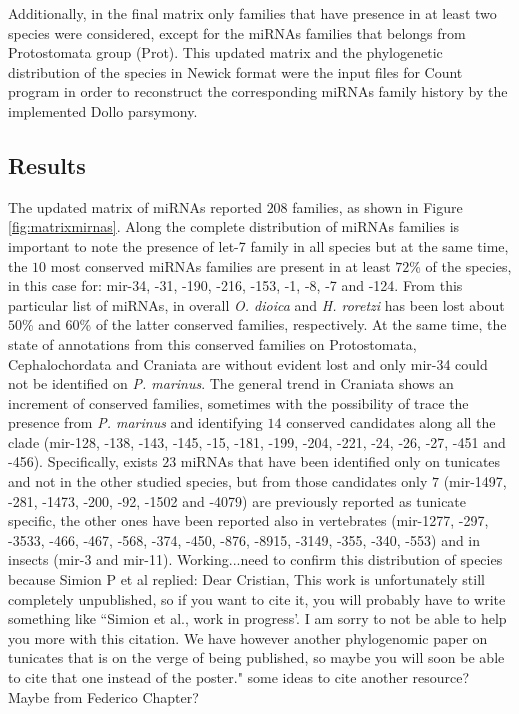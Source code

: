 \documentclass[11pt]{article}
\newcommand{\CAVH}[1]{\begingroup\color{red}#1\endgroup}
\begin{document}
Additionally, in the final matrix only families that have presence in at least 
two species were considered, except for the miRNAs families that belongs from 
Protostomata group (Prot). This updated matrix and the phylogenetic 
distribution of the species in Newick format were the input files for Count 
program \cite{Csuos2010} in order to reconstruct the corresponding miRNAs family 
history by the implemented Dollo parsymony.

\subsection*{Results}
The updated matrix of miRNAs reported $208$ families, as shown in Figure 
\ref{fig:matrixmirnas}. Along the complete distribution of miRNAs families is 
important to note the presence of let-7 family in all species but at the same 
time, the $10$ most conserved miRNAs families are present in at least $72$\% of 
the species, in this case for: mir-34, -31, -190, -216, -153, -1, -8, -7 and 
-124. From this particular list of miRNAs, in overall \textit{O. dioica} and 
\textit{H. roretzi} has been lost about $50$\% and $60$\% of the latter 
conserved families, respectively. At the same time, the state of annotations 
from this conserved families on Protostomata, Cephalochordata and Craniata are 
without evident lost and only mir-34 could not be identified on \textsl{P. 
marinus}. The general trend in Craniata shows an increment of conserved 
families, sometimes with the possibility of trace the presence from \textit{P. 
marinus} and identifying $14$ conserved candidates along all the clade 
(mir-128, -138, -143, -145, -15, -181, -199, -204, -221, -24, -26, -27, -451 
and -456). Specifically, exists $23$ miRNAs that have been identified only on 
tunicates and not in the other studied species, but from those candidates only 
$7$ (mir-1497, -281, -1473, -200, -92, -1502 and -4079) are previously reported 
as tunicate specific, the other ones have been reported also in vertebrates 
(mir-1277, -297, -3533, -466, -467, -568, -374, -450, -876, -8915, -3149, -355,
-340, -553) and in insects (mir-3 and mir-11). \CAVH{Working...need to confirm
this distribution of species because Simion P et al replied: Dear Cristian, 
This work is unfortunately still completely unpublished, so if you want to cite 
it, you will probably have to write something like ``Simion et al., work in 
progress'. I am sorry to not be able to help you more with this citation. We 
have however another phylogenomic paper on tunicates that is on the verge of 
being published, so maybe you will soon be able to cite that one instead of the 
poster." some ideas to cite another resource? Maybe from Federico Chapter?}
\end{document}
